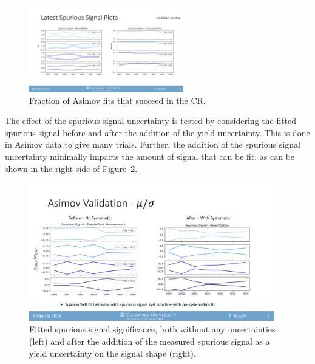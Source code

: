 \begin{figure}[!htbp]
\centering
   \includegraphics[width=0.6\textwidth]{figures/systs/spursig_success_cr}
    \caption{Fraction of Asimov fits that succeed in the CR.
    \label{fig:spursig_success}}
\end{figure}

The effect of the spurious signal uncertainty is tested by considering the fitted spurious signal before and after the addition of the yield uncertainty.
This is done in Asimov data to give many trials.
Further, the addition of the spurious signal uncertainty minimally impacts the amount of signal that can be fit, as can be shown in the right side of Figure~\ref{fig:spursig_beforeafter}.
\begin{figure}[!htbp]
\centering
   \includegraphics[width=0.95\textwidth]{figures/systs/spursig_beforeafter}
    \caption{Fitted spurious signal significance, both without any uncertainties (left) and after the addition of the measured spurious signal as a yield uncertainty on the signal shape (right).
    \label{fig:spursig_beforeafter}}
\end{figure}

